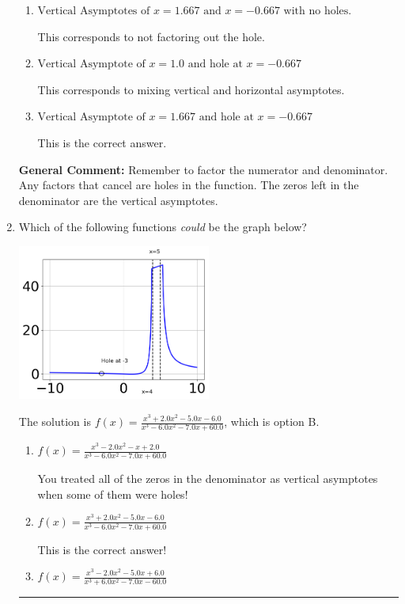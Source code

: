\documentclass{extbook}[14pt]
\newcommand{\litem}[1]{\item #1

\rule{\textwidth}{0.4pt}}
\begin{document}
\begin{enumerate}
{\begin{enumerate}[label=\Alph*.]
This corresponds to setting the numerator equal to 0.
\item \( \text{Vertical Asymptotes of } x = 1.667 \text{ and } x = -0.667 \text{ with no holes.} \)

This corresponds to not factoring out the hole.
\item \( \text{Vertical Asymptote of } x = 1.0 \text{ and hole at } x = -0.667 \)

This corresponds to mixing vertical and horizontal asymptotes.
\item \( \text{Vertical Asymptote of } x = 1.667 \text{ and hole at } x = -0.667 \)

This is the correct answer.
\end{enumerate}

\textbf{General Comment:} Remember to factor the numerator and denominator. Any factors that cancel are holes in the function. The zeros left in the denominator are the vertical asymptotes.
}
\litem{
Which of the following functions \textit{could} be the graph below?

\begin{center}
    \includegraphics[width=0.5\textwidth]{../Figures/identifyGraphOfRationalFunctionCopyB.png}
\end{center}


The solution is \( f(x)=\frac{x^{3} +2.0 x^{2} -5.0 x -6.0}{x^{3} -6.0 x^{2} -7.0 x + 60.0} \), which is option B.\begin{enumerate}[label=\Alph*.]
\item \( f(x)=\frac{x^{3} -2.0 x^{2} -x + 2.0}{x^{3} -6.0 x^{2} -7.0 x + 60.0} \)

You treated all of the zeros in the denominator as vertical asymptotes when some of them were holes!
\item \( f(x)=\frac{x^{3} +2.0 x^{2} -5.0 x -6.0}{x^{3} -6.0 x^{2} -7.0 x + 60.0} \)

This is the correct answer!
\item \( f(x)=\frac{x^{3} -2.0 x^{2} -5.0 x + 6.0}{x^{3} +6.0 x^{2} -7.0 x -60.0} \)


\end{enumerate}}
\end{enumerate}
\end{document}
